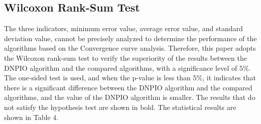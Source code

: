 \documentclass[preprint,review,compress,12pt]{elsarticle}
\begin{document}
\subsection{Wilcoxon Rank-Sum Test} The three indicators, minimum error value, average error value, and standard deviation value, cannot be precisely analyzed to determine the performance of the algorithms based on the Convergence curve analysis. Therefore, this paper adopts the Wilcoxon rank-sum test\cite{wilcoxon1992individual,kazikova2021does} to verify the superiority of the results between the DNPIO algorithm and the compared algorithms, with a significance level of $5\%$. The one-sided test is used, and when the p-value is less than $5\%$, it indicates that there is a significant difference between the DNPIO algorithm and the compared algorithms, and the value of the DNPIO algorithm is smaller. The results that do not satisfy the hypothesis test are shown in bold. The statistical results are shown in Table 4.
\end{document}
